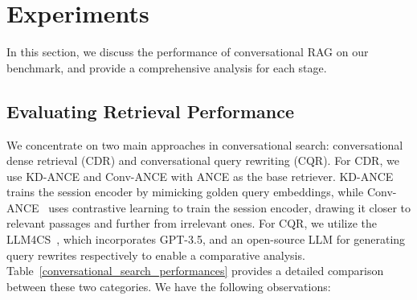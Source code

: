 \documentclass[11pt]{article}
\begin{document}





\section{Experiments}


In this section, we discuss the performance of conversational RAG on our benchmark, and provide a comprehensive analysis for each stage.



\subsection{Evaluating Retrieval Performance}

We concentrate on two main approaches in conversational search: conversational dense retrieval (CDR) and conversational query rewriting (CQR). For CDR, we use KD-ANCE and Conv-ANCE with ANCE as the base retriever. KD-ANCE~\citep{yu_sigir21_cdr} trains the session encoder by mimicking golden query embeddings, while Conv-ANCE~\citep{Karpukhin_dpr_emnlp20,lin_emnlp21_cdr} uses contrastive learning to train the session encoder, drawing it closer to relevant passages and further from irrelevant ones. For CQR, we utilize the LLM4CS~\citep{mao_emnlp23_llm4cs}, which incorporates GPT-3.5, and an open-source LLM for generating query rewrites respectively to enable a comparative analysis. Table~\ref{conversational_search_performances} provides a detailed comparison between these two categories. We have the following observations:
\end{document}

